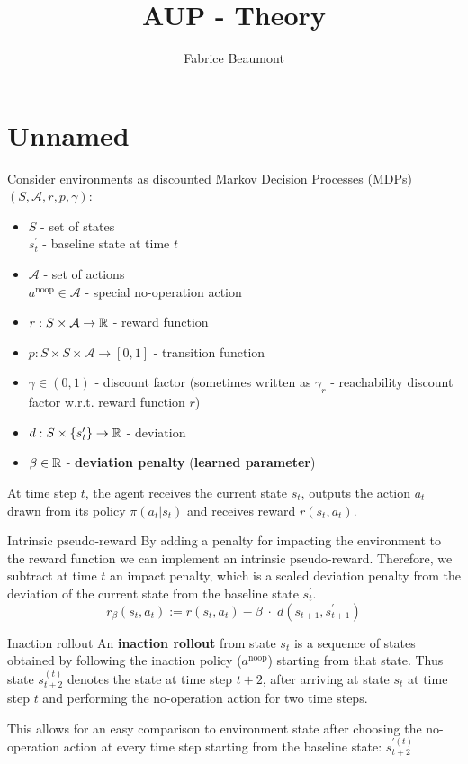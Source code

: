 



\title{AUP - Theory}
\author{Fabrice Beaumont}
\maketitle
\tableofcontents

\chapter{Unnamed}

Consider environments as discounted Markov Decision Processes (MDPs) $(S, \mathcal{A}, r, p, \gamma)$:
\begin{itemize}
	\item $S$ - set of states\\
	$s_t^\prime$ - baseline state at time $t$
	\item $\mathcal{A}$ - set of actions\\
	$a^{\text{noop}}\in \mathcal{A}$ - special no-operation action
	\item $r: S\times \mathcal{A} \to \mathbb{R}$ - reward function
	\item $p: S\times S\times \mathcal{A} \to [0,1]$ - transition function
	\item $\gamma \in (0,1)$ - discount factor (sometimes written as $\gamma_r$ - reachability discount factor w.r.t. reward function $r$)
	\item $d: S\times \{ s_t^\prime \} \to \mathbb{R}$ - deviation
	\item $\beta\in \mathbb{R}$ - \textbf{deviation penalty} (\textbf{learned parameter})
\end{itemize}
At time step $t$, the agent receives the current state $s_t$, outputs the action $a_t$ drawn from its policy $\pi(a_t| s_t)$ and receives reward $r(s_t, a_t)$.


\begin{Definition}{Intrinsic pseudo-reward}{}{}
	By adding a penalty for impacting the environment to the reward function we can implement an intrinsic pseudo-reward.
	Therefore, we subtract at time $t$ an impact penalty, which is a scaled deviation penalty from the deviation of the current state from the baseline state $s_t^\prime$.
	\[  r_\beta(s_t, a_t) := r(s_t, a_t) - \beta \; \cdot \; d(s_{t+1}, s_{t+1}^\prime ) \]
\end{Definition}


\begin{Definition}{Inaction rollout}{}{}
	An \textbf{inaction rollout} from state $s_t$ is a sequence of states obtained by following the inaction policy ($a^{\text{noop}}$) starting from that state. Thus state $s_{t+2}^{(t)}$ denotes the state at time step $t+2$, after arriving at state $s_t$ at time step $t$ and performing the no-operation action for two time steps.
	
	This allows for an easy comparison to environment state after choosing the no-operation action at every time step starting from the baseline state: $s^{\prime(t)}_{t+2}$
\end{Definition}

